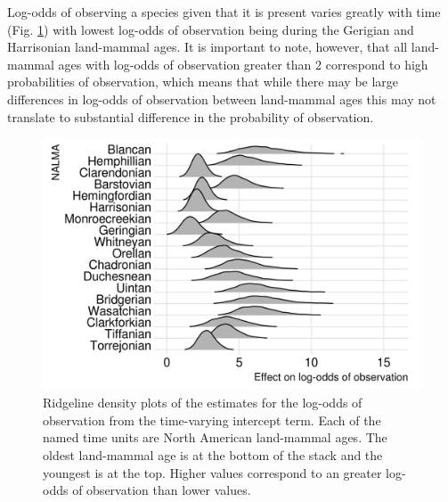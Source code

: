 \documentclass[12pt,letterpaper]{article}
\begin{document}
Log-odds of observing a species given that it is present varies greatly with time (Fig. \ref{fig:time_observe}) with lowest log-odds of observation being during the Gerigian and Harrisonian land-mammal ages. It is important to note, however, that all land-mammal ages with log-odds of observation greater than 2 correspond to high probabilities of observation, which means that while there may be large differences in log-odds of observation between land-mammal ages this may not translate to substantial difference in the probability of observation.
\begin{figure}[ht]
  \centering
  \includegraphics[width=\textwidth,height=0.4\textheight,keepaspectratio=true]{figure/time_observation}
  \caption{Ridgeline density plots of the estimates for the log-odds of observation from the time-varying intercept term. Each of the named time units are North American land-mammal ages. The oldest land-mammal age is at the bottom of the stack and the youngest is at the top. Higher values correspond to an greater log-odds of observation than lower values.}
  \label{fig:time_observe}
\end{figure}
\end{document}

